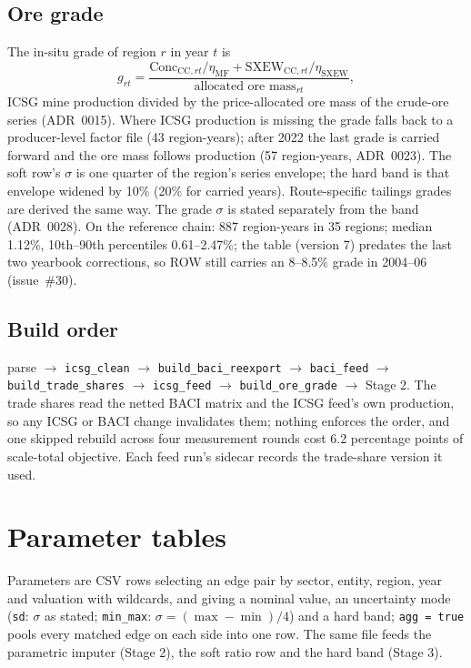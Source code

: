 \documentclass[11pt]{article}
\begin{document}
\subsection{Ore grade}
The in-situ grade of region $r$ in year $t$ is
\begin{equation}
g_{rt} = \frac{\mathrm{Conc}_{\mathrm{CC},rt}/\eta_{\mathrm{MF}} +
\mathrm{SXEW}_{\mathrm{CC},rt}/\eta_{\mathrm{SXEW}}}{\text{allocated ore
mass}_{rt}},
\end{equation}
ICSG mine production divided by the price-allocated ore mass of the crude-ore
series (ADR~0015). Where ICSG production is missing the grade falls back to
a producer-level factor file (43 region-years); after 2022 the last grade is
carried forward and the ore mass follows production (57 region-years,
ADR~0023). The soft row's $\sigma$ is one quarter of the region's series
envelope; the hard band is that envelope widened by 10\% (20\% for carried
years). Route-specific tailings grades are derived the same way. The grade
$\sigma$ is stated separately from the band (ADR~0028). On the reference
chain: 887 region-years in 35 regions; median 1.12\%, 10th--90th percentiles
0.61--2.47\%; the table (version 7) predates the last two yearbook
corrections, so ROW still carries an 8--8.5\% grade in 2004--06 (issue~\#30).

\subsection{Build order}
parse $\to$ \texttt{icsg\_clean} $\to$ \texttt{build\_baci\_reexport} $\to$
\texttt{baci\_feed} $\to$ \texttt{build\_trade\_shares} $\to$
\texttt{icsg\_feed} $\to$ \texttt{build\_ore\_grade} $\to$ Stage 2. The
trade shares read the netted BACI matrix and the ICSG feed's own
production, so any ICSG or BACI change invalidates them; nothing enforces
the order, and one skipped rebuild across four measurement rounds cost 6.2
percentage points of scale-total objective. Each feed run's sidecar records
the trade-share version it used.

\section{Parameter tables}\label{si:params}

Parameters are CSV rows selecting an edge pair by sector, entity, region,
year and valuation with wildcards, and giving a nominal value, an
uncertainty mode (\texttt{sd}: $\sigma$ as stated; \texttt{min\_max}: $\sigma
= (\max - \min)/4$) and a hard band; \texttt{agg = true} pools every matched
edge on each side into one row. The same file feeds the parametric imputer
(Stage 2), the soft ratio row and the hard band (Stage 3).
\end{document}
